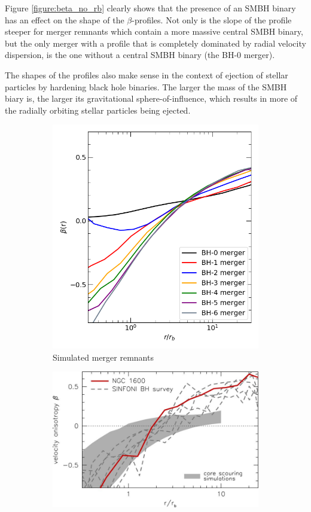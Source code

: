 \documentclass[english, oneside]{HYgradu}
\begin{document}
Figure \ref{figure:beta_no_rb} clearly shows that the presence of an SMBH binary has an effect on the shape of the $\beta$-profiles. Not only is the slope of the profile steeper for merger remnants which contain a more massive central SMBH binary, but the only merger with a profile that is completely dominated by radial velocity dispersion, is the one without a central SMBH binary (the BH-0 merger). 

The shapes of the profiles also make sense in the context of ejection of stellar particles by hardening black hole binaries. The larger the mass of the SMBH biary is, the larger its gravitational sphere-of-influence, which results in more of the radially orbiting stellar particles being ejected.

\begin{figure}
	\centering
	\begin{subfigure}[b]{0.39\textwidth}
		\includegraphics[width=\textwidth]{beta.png}	
		\caption{Simulated merger remnants}
	\end{subfigure}
	\begin{subfigure}[b]{0.60\textwidth}
		\includegraphics[width=\textwidth]{thomas2016.jpg}

\end{subfigure}
\end{figure}
\end{document}
